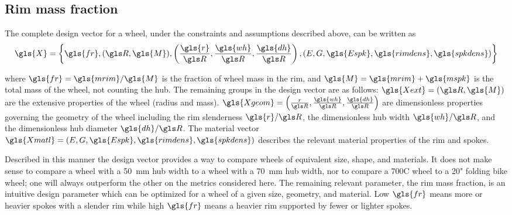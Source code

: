 \documentclass[\rootdir/thesis.tex]{subfiles}
\begin{document}
\subsection{Rim mass fraction}

The complete design vector for a wheel, under the constraints and assumptions described above, can be written as
\begin{equation}
\label{eqn:design_vector}
\gls{X} = \left\lbrace \gls{fr}, (\R, \gls{M}), \left(\frac{\gls{r}}{\R}, \frac{\gls{wh}}{\R}, \frac{\gls{dh}}{\R}\right), (E, G, \gls{Espk}, \gls{rimdens}, \gls{spkdens}) \right\rbrace
\end{equation}

where $\gls{fr} = \gls{mrim}/\gls{M}$ is the fraction of wheel mass in the rim, and $\gls{M}=\gls{mrim} + \gls{mspk}$ is the total mass of the wheel, not counting the hub. The remaining groups in the design vector are as follows: $\gls{Xext}=(\R, \gls{M})$ are the extensive properties of the wheel (radius and mass). $\gls{Xgeom} = \left(\frac{r}{\R}, \frac{\gls{wh}}{\R}, \frac{\gls{dh}}{\R}\right)$ are dimensionless properties governing the geometry of the wheel including the rim slenderness $\gls{r}/\R$, the dimensionless hub width $\gls{wh}/\R$, and the dimensionless hub diameter $\gls{dh}/\R$. The material vector $\gls{Xmatl}= (\E, \G, \gls{Espk}, \gls{rimdens}, \gls{spkdens})$ describes the relevant material properties of the rim and spokes.

Described in this manner the design vector provides a way to compare wheels of equivalent size, shape, and materials. It does not make sense to compare a wheel with a \SI{50}{mm} hub width to a wheel with a \SI{70}{mm} hub width, nor to compare a 700C wheel to a 20" folding bike wheel; one will always outperform the other on the metrics considered here. The remaining relevant parameter, the rim mass fraction, is an intuitive design parameter which can be optimized for a wheel of a given size, geometry, and material. Low $\gls{fr}$ means more or heavier spokes with a slender rim while high $\gls{fr}$ means a heavier rim supported by fewer or lighter spokes.

\end{document}
